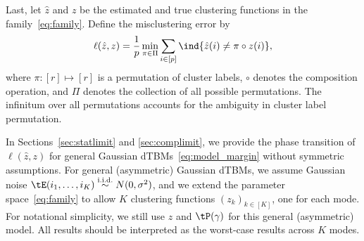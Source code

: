 \documentclass[lettersize,onecolumn,journal]{IEEEtran}
\theoremstyle{definition}
\theoremstyle{definition}
\begin{document}
Last, let $\hat z$ and $z$ be the estimated and true clustering functions in the family~\eqref{eq:family}. Define the misclustering error by
\[
\ell(\hat z, z)={1\over p}\min_{\pi \in \Pi}\sum_{i\in[p]}\ind\{\hat z(i)\neq \pi \circ z(i)\},
\]
where $\pi: [r] \mapsto [r]$ is a permutation of cluster labels, $\circ$ denotes the composition operation, and $\Pi$ denotes the collection of all possible permutations. The infinitum over all permutations accounts for the ambiguity in cluster label permutation. 

In Sections~\ref{sec:statlimit} and \ref{sec:complimit}, we provide the phase transition of $\ell (\hat z, z)$ for general Gaussian dTBMs~\eqref{eq:model_margin} without symmetric assumptions. For general (asymmetric) Gaussian dTBMs, we assume Gaussian noise $\tE(i_1,\ldots,i_K)\stackrel{\text{i.i.d.}}{\sim} N(0,\sigma^2)$, and we extend the parameter space~\eqref{eq:family} to allow $K$ clustering functions $(z_k)_{k\in[K]}$, one for each mode. For notational simplicity, we still use $z$ and $\tP(\gamma)$ for this general (asymmetric) model. All results should be interpreted as the worst-case results across $K$ modes. 
\end{document}
